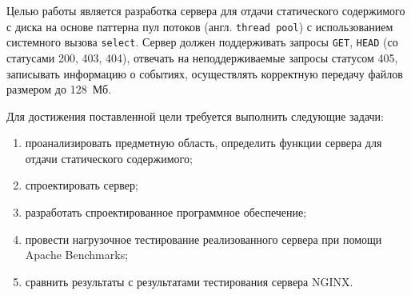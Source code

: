 

Целью работы является разработка сервера для отдачи статического содержимого с диска на основе паттерна пул потоков (англ. \texttt{thread pool}) с использованием системного вызова \texttt{select}.
Сервер должен поддерживать запросы \texttt{GET}, \texttt{HEAD} (со статусами 200, 403, 404), отвечать на неподдерживаемые запросы статусом 405, записывать информацию о событиях, осуществлять корректную передачу файлов размером до 128~Мб.

Для достижения поставленной цели требуется выполнить следующие задачи:
\begin{enumerate}
	\item проанализировать предметную область, определить функции сервера для отдачи статического содержимого;
	\item спроектировать сервер;
	\item разработать спроектированное программное обеспечение;
	\item провести нагрузочное тестирование реализованного сервера при помощи Apache Benchmarks;
	\item сравнить результаты с результатами тестирования сервера NGINX.
\end{enumerate}


